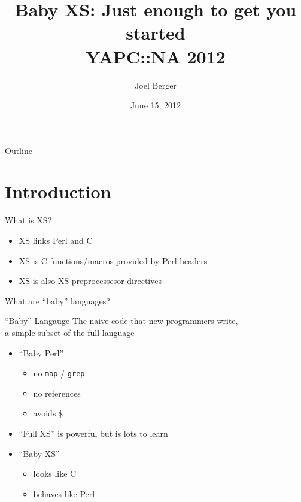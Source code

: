 \documentclass{beamer}
\title[Baby XS]{Baby XS: Just enough to get you started\\YAPC::NA 2012}
\author{Joel Berger}
\institute[UIC]{University of Illinois at Chicago}
\date{June 15, 2012}
\providecommand{\code}[1]{{\texttt{\scriptsize{#1}}}}
\begin{document}
\begin{frame}
  \maketitle
  \insertlogo
\end{frame}

\begin{frame}{Outline}
  \tableofcontents
\end{frame}

\section{Introduction}

\begin{frame}{What is XS?}
  \begin{itemize}
    \item XS links Perl and C
    \item XS is C functions/macros provided by Perl headers
    \item XS is also XS-preprocessesor directives
  \end{itemize}
\end{frame}

\begin{frame}{What are ``baby'' languages?}
  \begin{block}{``Baby'' Langauge}
    The naive code that new programmers write,\\a simple subset of the full language
  \end{block}
  \begin{itemize}
    \item ``Baby Perl''
      \begin{itemize}
        \item no \code{map} / \code{grep}
        \item no references
        \item avoids \code{\$\_}
      \end{itemize}
    \item ``Full XS'' is powerful but is lots to learn
    \item ``Baby XS'' 
     \begin{itemize}
       \item looks like C
       \item behaves like Perl
     \end{itemize}
  \end{itemize}
\end{frame}
\end{document}
